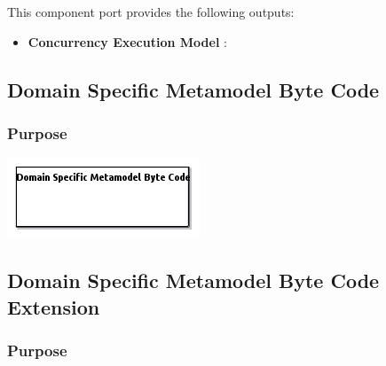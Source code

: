 \documentclass{gemoc} %
\begin{document}
This component port provides the following outputs:
\begin{itemize}
  \item \textbf{Concurrency Execution Model} :
\end{itemize}


\subsection{Domain Specific Metamodel Byte Code}


\subsubsection{Purpose}


\begin{center}
\includegraphics*[trim=0.0cm 0.0cm 0cm 0.0cm, clip=true]{../images/generated/Generated_Domain_Specific_Metamodel_Byte_Code.png}
\end{center}




\subsection{Domain Specific Metamodel Byte Code Extension}


\subsubsection{Purpose}

\end{document}
